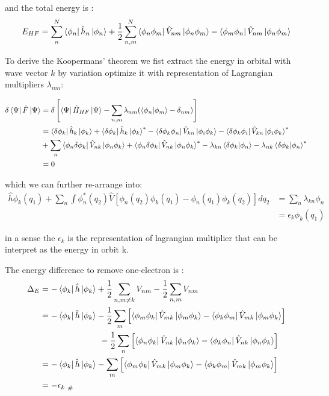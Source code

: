 \documentclass[notitlepage]{revtex4-1}
\begin{document}
\begin{CJK}{UTF8}{bsmi}
\begin{enumerate}
	and the total energy is :
	\begin{equation*}
	E_{HF} = \sum_{n}^{N} \bra{\phi_{n}} \hat{h}_{n}  \ket{\phi_n} + \frac{1}{2} \sum_{n,m}^{N} \bra{\phi_n\phi_m} \hat{V}_{nm}\ket{\phi_n\phi_m} - \bra{\phi_m\phi_n} \hat{V}_{nm}\ket{\phi_n\phi_m}
	\end{equation*}
	
	
	To derive the Koopermans' theorem we fist extract the energy in orbital with wave vector $k$ by variation optimize it with representation of Lagrangian multipliers $\lambda_{nm}$:
	
	\begin{align*}
		\delta \bra{\Psi}\hat{F}\ket{\Psi} &= \delta \left[ \bra{\Psi} \hat{H}_{HF} \ket{\Psi} - \sum_{n,m} \lambda_{nm} (\bra{\phi_{n}}\ket{\phi_{m}}-\delta_{nm})  \right] \\
		&= \bra{\delta\phi_k} \hat{h}_k\ket{\phi_k} + \bra{\delta \phi_k} \hat{h}_k \ket{\phi_k}^* - \bra{\delta \phi_k \phi_n} \hat{V}_{kn} \ket{\phi_i\phi_k} - \bra{\delta\phi_k\phi_i} \hat{V}_{kn}\ket{\phi_i\phi_k}^* \\ 
		& + \sum_{n} \bra{\phi_n \delta \phi_k} \hat{V}_{nk}\ket{\phi_n\phi_k} + \bra{\phi_n \delta \phi_k} \hat{V}_{nk}\ket{\phi_n\phi_k}^* -  \lambda_{kn}\bra{\delta\phi_k}\ket{\phi_n} - \lambda_{nk}\bra{\delta\phi_k}\ket{\phi_n}^* \\
		&= 0
	\end{align*} 
	
	which we can further re-arrange into:
	\begin{align*}
		\hat{h} \phi_k(q_1) + \sum_{n}  \int \phi_{n}^{*}(q_2) \hat{V}\left[\phi_n(q_2)\phi_k(q_1) - \phi_n(q_1)\phi_k(q_2)\right] dq_2 &= \sum_{n} \lambda_{kn}\phi_n \\	
		&= \epsilon_k\phi_k(q_1)
	\end{align*}
	
	in a sense the $\epsilon_k$ is the representation of lagrangian multiplier that can be interpret as the energy in orbit k. 
	
	The energy difference to remove one-electron is :
	\begin{align*}
	\Delta_E &= -\bra{\phi_k} \hat{h} \ket{\phi_k} + \frac{1}{2} \sum_{n,m \neq k} V_{nm} - \frac{1}{2} \sum_{n,m} V_{nm} \\
	&= -\bra{\phi_k} \hat{h} \ket{\phi_k}  - \frac{1}{2} \sum_{m} \left[ \bra{\phi_m\phi_k}\hat{V}_{mk}\ket{\phi_m\phi_k} - \bra{\phi_k\phi_m}\hat{V}_{mk}\ket{\phi_m\phi_k} \right] \\
    & 	\hspace{2.5cm} - \frac{1}{2} \sum_{n} \left[ \bra{\phi_n\phi_k}\hat{V}_{nk}\ket{\phi_n\phi_k} - \bra{\phi_k\phi_n}\hat{V}_{nk}\ket{\phi_n\phi_k} \right] \\
	&= -\bra{\phi_k} \hat{h} \ket{\phi_k}  - \sum_{m} \left[ \bra{\phi_m\phi_k}\hat{V}_{mk}\ket{\phi_m\phi_k} - \bra{\phi_k\phi_m}\hat{V}_{mk}\ket{\phi_m\phi_k} \right] \\
	&= -{\epsilon_k \hspace{0.1cm}}_{ \#}
	\end{align*}


\end{enumerate}
\end{CJK}
\end{document}
